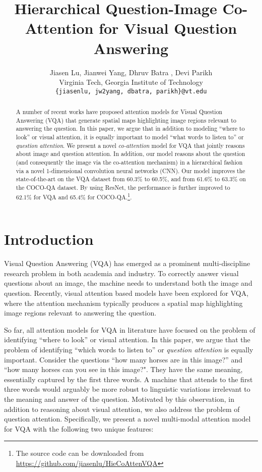 \documentclass{article}
\title{Hierarchical Question-Image Co-Attention \newline for Visual Question Answering}
\author{Jiasen Lu, Jianwei Yang, Dhruv Batra , Devi Parikh\\
 Virginia Tech,  Georgia Institute of Technology \\
{\tt\small \{jiasenlu, jw2yang, dbatra, parikh\}@vt.edu}
}
\begin{document}
\maketitle
\begin{abstract}
A number of recent works have proposed attention models for Visual Question Answering (VQA) that generate spatial maps highlighting image regions relevant to answering the question. In this paper, we argue that in addition to modeling ``where to look'' or visual attention, it is equally important to model ``what words to listen to'' or \emph{question attention}. We present a novel \emph{co-attention} model for VQA that jointly reasons about image and question attention. In addition, our model reasons about the question (and consequently the image via the co-attention mechanism) in a hierarchical fashion via a novel 1-dimensional convolution neural networks (CNN). Our model improves the state-of-the-art on the VQA dataset from 60.3\% to 60.5\%, and from 61.6\% to 63.3\% on the COCO-QA dataset. By using ResNet, the performance is further improved to 62.1\% for VQA and 65.4\% for COCO-QA.\footnote{The source code can be downloaded from \url{https://github.com/jiasenlu/HieCoAttenVQA}}.
\end{abstract}
\section{Introduction}
\label{sec:intro}
\vspace*{-2mm}
Visual Question Answering (VQA) \cite{antol2015vqa, gao2015you, malinowski2015ask, ren2015exploring, zitnick2016measuring} has emerged as a prominent multi-discipline research problem in both academia and industry. To correctly answer visual questions about an image, the machine needs to understand both the image and question.
Recently, visual attention based models \cite{shih2015look, xiong2016dynamic, xu2015ask, yang2015stacked} have been explored for VQA, where the attention mechanism typically produces a spatial map highlighting image regions relevant to answering the question. 

So far, all attention models for VQA in literature have focused on the problem of identifying ``where to look'' or visual attention. In this paper, we argue that the problem of identifying ``which words to listen to''  or \emph{question attention} is equally important.  Consider the questions ``how many horses are in this image?'' and ``how many horses can you see in this image?". They have the same meaning, essentially captured by the first three words. A machine that attends to the first three words would arguably be more robust to linguistic variations irrelevant to the meaning and answer of the question. Motivated by this observation, in addition to reasoning about visual attention, we also address the problem of question attention. Specifically, we present a novel multi-modal attention model for VQA with the following two unique features:
\end{document}
